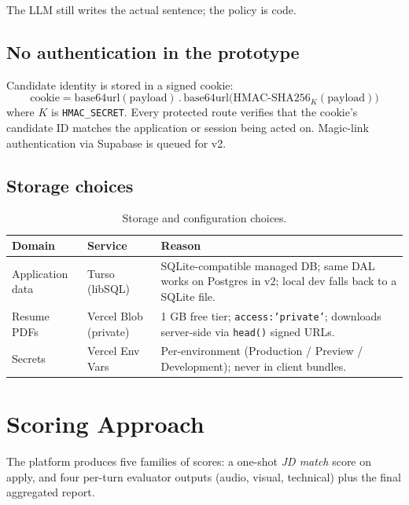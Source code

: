 \documentclass[11pt,a4paper]{article}
\begin{document}
The LLM still writes the actual sentence; the policy is code.

\subsection{No authentication in the prototype}

Candidate identity is stored in a signed cookie:
\[
\text{cookie} = \mathrm{base64url}(\text{payload})\,.\,\mathrm{base64url}\bigl(\text{HMAC-SHA256}_{K}(\text{payload})\bigr)
\]
where $K$ is \texttt{HMAC\_SECRET}. Every protected route verifies that
the cookie's candidate ID matches the application or session being acted
on. Magic-link authentication via Supabase is queued for v2.

\subsection{Storage choices}

\begin{table}[h]
\centering
\renewcommand{\arraystretch}{1.25}
\begin{tabular}{@{}p{3.0cm} p{4.6cm} p{7.2cm}@{}}
\toprule
\textbf{Domain} & \textbf{Service} & \textbf{Reason} \\
\midrule
Application data & Turso (libSQL)        & SQLite-compatible managed DB; same DAL works on Postgres in v2; local dev falls back to a SQLite file. \\
Resume PDFs      & Vercel Blob (private) & 1 GB free tier; \texttt{access:'private'}; downloads server-side via \texttt{head()} signed URLs. \\
Secrets          & Vercel Env Vars       & Per-environment (Production / Preview / Development); never in client bundles. \\
\bottomrule
\end{tabular}
\caption{Storage and configuration choices.}
\end{table}

\section{Scoring Approach}\label{sec:scoring}

The platform produces five families of scores: a one-shot \emph{JD match}
score on apply, and four per-turn evaluator outputs (audio, visual,
technical) plus the final aggregated report.
\end{document}
